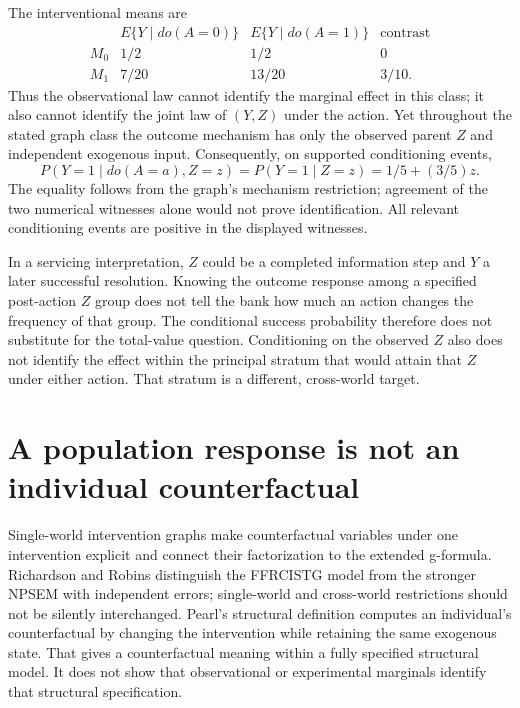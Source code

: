 The interventional means are
\[
\begin{array}{c|cc|c}
 &E\{Y\mid do(A=0)\}&E\{Y\mid do(A=1)\}&\text{contrast}\\ \hline
 M_0&1/2&1/2&0\\
 M_1&7/20&13/20&3/10 .
\end{array}
\]
Thus the observational law cannot identify the marginal effect in
this class; it also cannot identify the joint law of $(Y,Z)$ under
the action. Yet throughout the stated graph class the outcome mechanism
has only the observed parent $Z$ and independent exogenous input.
Consequently, on supported conditioning events,
\[
 P(Y=1\mid do(A=a),Z=z)=P(Y=1\mid Z=z)
                     =1/5+(3/5)z.
\]
The equality follows from the graph's mechanism restriction; agreement
of the two numerical witnesses alone would not prove identification.
All relevant conditioning events are positive in the displayed
witnesses.~\citep{id2006,exec17_s3_exact}

In a servicing interpretation, $Z$ could be a completed information
step and $Y$ a later successful resolution. Knowing the outcome response
among a specified post-action $Z$ group does not tell the bank how much
an action changes the frequency of that group. The conditional success
probability therefore does not substitute for the total-value question.
Conditioning on the observed $Z$ also does not identify the effect
within the principal stratum that would attain that $Z$ under either
action. That stratum is a different, cross-world target.

\section{A population response is not an individual counterfactual}
\label{exec17:s3-coupling}

Single-world intervention graphs make counterfactual variables under
one intervention explicit and connect their factorization to the
extended g-formula. Richardson and Robins distinguish the FFRCISTG
model from the stronger NPSEM with independent errors; single-world
and cross-world restrictions should not be silently interchanged.
Pearl's structural definition computes an individual's counterfactual
by changing the intervention while retaining the same exogenous state.
That gives a counterfactual meaning within a fully specified structural
model. It does not show that observational or experimental marginals
identify that structural specification.~\citep{swig2013,pearl2009}

